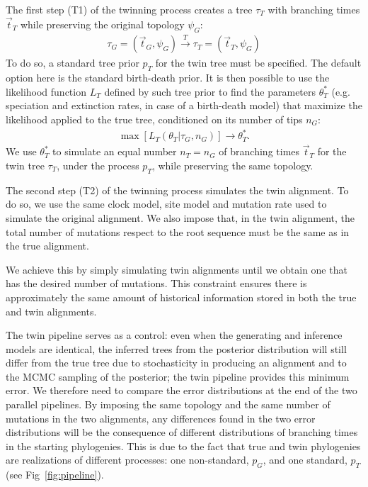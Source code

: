 The first step (T1) of the twinning process creates a tree $\tau_{\mathit{T}}$
with branching times $\Vec{t}_{\mathit{T}}$ while preserving the original
topology $\psi_{\mathit{G}}$:
\begin{align}
  \tau_{\mathit{G}} = (\Vec{t}_{\mathit{G}}, \psi_{\mathit{G}}) 
  \xrightarrow[]{\mathit{T}} 
  \tau_{\mathit{T}} = (\Vec{t}_{\mathit{T}}, \psi_{\mathit{G}})
\end{align}
To do so, a standard tree prior $p_T$ for the twin tree must be specified. The default option here is the standard birth-death prior.
It is then possible to use the likelihood function $L_{\mathit{T}}$ defined by such tree prior to find the parameters $\theta^{*}_{\mathit{T}}$ 
(e.g. speciation and extinction rates, in case of a birth-death model) 
that maximize the likelihood applied 
to the true tree, conditioned on its number of tips $n_{\mathit{G}}$:
\begin{align}
    \max[L_{\mathit{T}}(\theta_{\mathit{T}}|\tau_{\mathit{G}}, n_{\mathit{G}})] 
\rightarrow \theta^{*}_{\mathit{T}}.
\end{align}
We use $\theta^{*}_{\mathit{T}}$ to simulate an equal number 
$n_{\mathit{T}} = n_{\mathit{G}}$ 
of branching times $\Vec{t}_{\mathit{T}}$ for the twin tree 
$\tau_{\mathit{T}}$, under the process $p_{T}$, 
while preserving the same topology.

The second step (T2) of the twinning process simulates the twin alignment. To do so, we use the same clock model, site model and mutation rate used to simulate the original alignment. 
We also impose that, in the twin alignment, the total number of mutations respect to the root sequence must be the same as in the true alignment.

We achieve this by simply simulating twin alignments until we
obtain one that has the desired number of mutations.
This constraint ensures there is approximately 
the same amount of historical information
stored in both the true and twin alignments.

The twin pipeline serves as a control: even when the generating and inference models are identical, the inferred trees from the posterior distribution will still differ from the true tree due to stochasticity in producing an alignment and to the MCMC sampling of the posterior; the twin pipeline provides this minimum error. We therefore need to compare the error distributions at the end of the two parallel pipelines.
By imposing the same topology and the same number of mutations in the two alignments, any differences found in the two error distributions will be the consequence of different distributions of branching times in the starting phylogenies. This is due to the fact that true and twin phylogenies are realizations of different processes: one non-standard, $p_G$, and one standard, $p_T$ (see Fig~\ref{fig:pipeline}).

